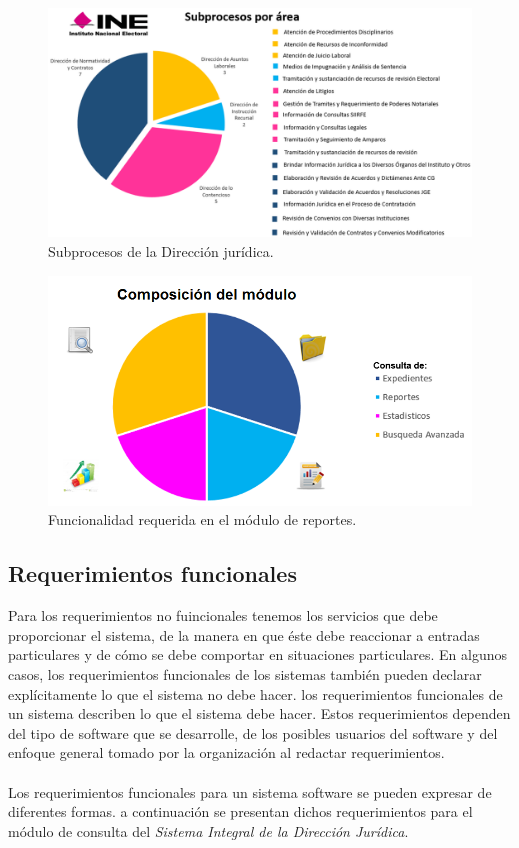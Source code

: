 \documentclass[../reportesINE.tex]{subfiles}
\begin{document}
\begin{figure}
  \centering
  \includegraphics[width=\linewidth]{img/subprocesosDJ.PNG}
  \caption{Subprocesos de la Dirección jurídica.}
  \label{fig:subprocesosDJ}
\end{figure}

\begin{figure}
  \centering
  \includegraphics[width=\linewidth]{img/modulo.PNG}
  \caption{Funcionalidad requerida en el módulo de reportes.}
  \label{fig:modulo}
\end{figure}


\subsection{Requerimientos funcionales}
Para los requerimientos no fuincionales tenemos los servicios que debe proporcionar el sistema, de la manera en que éste debe reaccionar a entradas particulares y de cómo se debe comportar en situaciones particulares. En algunos casos, los requerimientos funcionales de los sistemas también pueden declarar explícitamente lo que el sistema no debe hacer. los requerimientos funcionales de un sistema describen lo que el sistema debe hacer. Estos requerimientos dependen del tipo de software que se desarrolle, de los posibles usuarios del software y del enfoque general tomado por la organización al redactar requerimientos. \\ \\
Los requerimientos funcionales para un sistema software se pueden expresar de diferentes formas. a continuación se presentan dichos requerimientos para el módulo de consulta del \textit{Sistema Integral de la Dirección Jurídica}. \\
\end{document}
